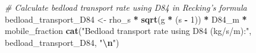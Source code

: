 \documentclass[
]{article}
\newenvironment{Shaded}{\begin{snugshade}}{\end{snugshade}}
\newcommand{\CommentTok}[1]{\textcolor[rgb]{0.56,0.35,0.01}{\textit{#1}}}
\newcommand{\DecValTok}[1]{\textcolor[rgb]{0.00,0.00,0.81}{#1}}
\newcommand{\FunctionTok}[1]{\textcolor[rgb]{0.13,0.29,0.53}{\textbf{#1}}}
\newcommand{\NormalTok}[1]{#1}
\newcommand{\OtherTok}[1]{\textcolor[rgb]{0.56,0.35,0.01}{#1}}
\newcommand{\SpecialCharTok}[1]{\textcolor[rgb]{0.81,0.36,0.00}{\textbf{#1}}}
\newcommand{\StringTok}[1]{\textcolor[rgb]{0.31,0.60,0.02}{#1}}
\begin{document}
\begin{Shaded}
\begin{Highlighting}[]
\CommentTok{\# Calculate bedload transport rate using D84 in Recking’s formula}
\NormalTok{bedload\_transport\_D84 }\OtherTok{\textless{}{-}}\NormalTok{ rho\_s }\SpecialCharTok{*} \FunctionTok{sqrt}\NormalTok{(g }\SpecialCharTok{*}\NormalTok{ (s }\SpecialCharTok{{-}} \DecValTok{1}\NormalTok{)) }\SpecialCharTok{*}\NormalTok{ D84\_m }\SpecialCharTok{*}\NormalTok{ mobile\_fraction}
\FunctionTok{cat}\NormalTok{(}\StringTok{"Bedload transport rate using D84 (kg/s/m):"}\NormalTok{, bedload\_transport\_D84, }\StringTok{"}\SpecialCharTok{\textbackslash{}n}\StringTok{"}\NormalTok{)}
\end{Highlighting}
\end{Shaded}

\begin{verbatim}

\end{verbatim}
\end{document}
